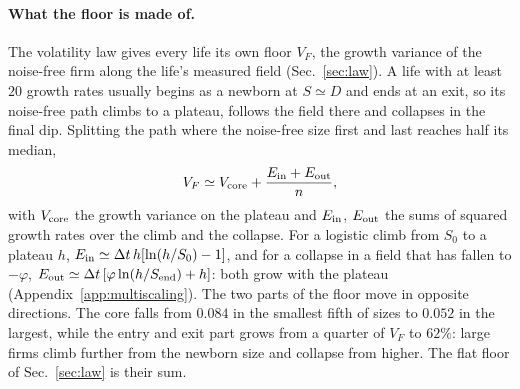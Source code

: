 \documentclass[pre,twocolumn,superscriptaddress,nofootinbib]{revtex4-2}
\begin{document}
\paragraph{What the floor is made of.}  The volatility law gives every life its own floor $V_F$, the
growth variance of the noise-free firm along the life's measured field (Sec.~\ref{sec:law}).  A life
with at least $20$ growth rates usually begins as a newborn at $S\simeq D$ and ends at an exit, so its
noise-free path climbs to a plateau, follows the field there and collapses in the final dip.  Splitting
the path where the noise-free size first and last reaches half its median,
\begin{equation}
V_F\simeq V_{\rm core}+\frac{E_{\rm in}+E_{\rm out}}{n},
\label{eq:floor}
\end{equation}
with $V_{\rm core}$ the growth variance on the plateau and $E_{\rm in}$, $E_{\rm out}$ the sums of squared growth rates
over the climb and the collapse.  For a logistic climb from $S_0$ to a plateau $h$,
$E_{\rm in}\simeq\Delta t\,h[\ln(h/S_0)-1]$, and for a collapse in a field that has fallen to $-\varphi$,
$E_{\rm out}\simeq\Delta t\,[\varphi\ln(h/S_{\rm end})+h]$: both grow with the plateau (Appendix~\ref{app:multiscaling}).
The two parts of the floor move in opposite directions.  The core falls from $0.084$ in the smallest fifth
of sizes to $0.052$ in the largest, while the entry and exit part grows from a quarter of $V_F$ to $62\%$:
large firms climb further from the newborn size and collapse from higher.  The flat floor of
Sec.~\ref{sec:law} is their sum.
\end{document}
